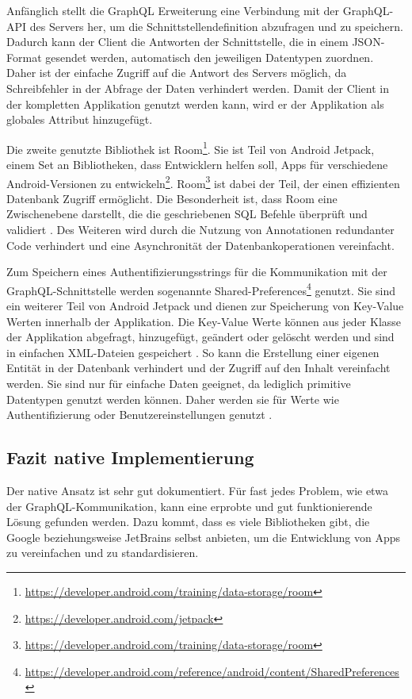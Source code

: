 Anfänglich stellt die GraphQL Erweiterung eine Verbindung mit der GraphQL-API des Servers her, um die Schnittstellendefinition abzufragen und zu speichern. Dadurch kann der Client die Antworten der Schnittstelle, die in einem JSON-Format gesendet werden, automatisch den jeweiligen Datentypen zuordnen. Daher ist der einfache Zugriff auf die Antwort des Servers möglich, da Schreibfehler in der Abfrage der Daten verhindert werden.
Damit der Client in der kompletten Applikation genutzt werden kann, wird er der Applikation als globales Attribut hinzugefügt.


Die zweite genutzte Bibliothek ist Room\footnote{\url{https://developer.android.com/training/data-storage/room}}. Sie ist Teil von Android Jetpack, einem Set an Bibliotheken, dass Entwicklern helfen soll, Apps für verschiedene Android-Versionen zu entwickeln\footnote{\url{https://developer.android.com/jetpack}}. Room\footnote{\url{https://developer.android.com/training/data-storage/room}} ist dabei der Teil, der einen effizienten Datenbank Zugriff ermöglicht.
Die Besonderheit ist, dass Room eine Zwischenebene darstellt, die die geschriebenen SQL Befehle überprüft und validiert \cite{Android_Room}. Des Weiteren wird durch die Nutzung von Annotationen redundanter Code verhindert und eine Asynchronität der Datenbankoperationen vereinfacht.

Zum Speichern eines Authentifizierungsstrings für die Kommunikation mit der GraphQL-\break Schnittstelle werden sogenannte Shared-Preferences\footnote{\url{https://developer.android.com/reference/android/content/SharedPreferences}} genutzt. 
Sie sind ein weiterer Teil von Android Jetpack und dienen zur Speicherung von Key-Value Werten innerhalb der Applikation. 
Die Key-Value Werte können aus jeder Klasse der Applikation abgefragt, hinzugefügt, geändert oder gelöscht werden und sind in einfachen XML-Dateien gespeichert \cite{Shared_Preferences_Android}. 
So kann die Erstellung einer eigenen Entität in der Datenbank verhindert und der Zugriff auf den Inhalt vereinfacht werden. 
Sie sind nur für einfache Daten geeignet, da lediglich primitive Datentypen genutzt werden können. 
Daher werden sie für Werte wie Authentifizierung oder Benutzereinstellungen genutzt \cite{Shared_Preferences_Android}.


\subsection{Fazit native Implementierung}
Der native Ansatz ist sehr gut dokumentiert. Für fast jedes Problem, wie etwa der GraphQL-Kommunikation, kann eine erprobte und gut funktionierende Lösung gefunden werden. Dazu kommt, dass es viele Bibliotheken gibt, die Google beziehungsweise JetBrains selbst anbieten, um die Entwicklung von Apps zu vereinfachen und zu standardisieren.

